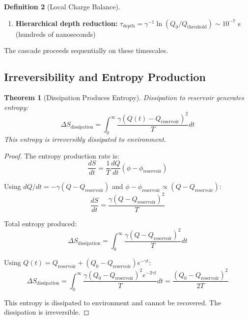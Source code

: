 \documentclass[12pt,a4paper]{article}
\theoremstyle{plain}
\newtheorem{theorem}{Theorem}[section]
\theoremstyle{definition}
\newtheorem{definition}[theorem]{Definition}
\theoremstyle{remark}
\begin{document}
\begin{definition}[Local Charge Balance]
\begin{enumerate}
\item \textbf{Hierarchical depth reduction:} $\tau_{\text{depth}} = \gamma^{-1} \ln(Q_0 / Q_{\text{threshold}}) \sim 10^{-7}$ s (hundreds of nanoseconds)
\end{enumerate}

The cascade proceeds sequentially on these timescales.

\subsection{Irreversibility and Entropy Production}

\begin{theorem}[Dissipation Produces Entropy]
\label{thm:dissipation_entropy}
Dissipation to reservoir generates entropy:
\begin{equation}
\Delta S_{\text{dissipation}} = \int_0^{\infty} \frac{\gamma (Q(t) - Q_{\text{reservoir}})^2}{T} dt
\end{equation}
This entropy is irreversibly dissipated to environment.
\end{theorem}

\begin{proof}
The entropy production rate is:
\begin{equation}
\frac{dS}{dt} = \frac{1}{T} \frac{dQ}{dt} (\phi - \phi_{\text{reservoir}})
\end{equation}

Using $dQ/dt = -\gamma (Q - Q_{\text{reservoir}})$ and $\phi - \phi_{\text{reservoir}} \propto (Q - Q_{\text{reservoir}})$:
\begin{equation}
\frac{dS}{dt} = \frac{\gamma (Q - Q_{\text{reservoir}})^2}{T}
\end{equation}

Total entropy produced:
\begin{equation}
\Delta S_{\text{dissipation}} = \int_0^{\infty} \frac{\gamma (Q - Q_{\text{reservoir}})^2}{T} dt
\end{equation}

Using $Q(t) = Q_{\text{reservoir}} + (Q_0 - Q_{\text{reservoir}}) e^{-\gamma t}$:
\begin{equation}
\Delta S_{\text{dissipation}} = \int_0^{\infty} \frac{\gamma (Q_0 - Q_{\text{reservoir}})^2 e^{-2\gamma t}}{T} dt = \frac{(Q_0 - Q_{\text{reservoir}})^2}{2T}
\end{equation}

This entropy is dissipated to environment and cannot be recovered. The dissipation is irreversible.
\end{proof}


\end{definition}
\end{document}
